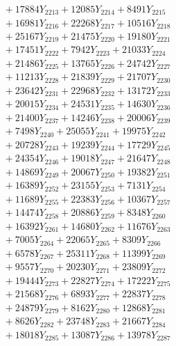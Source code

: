 \documentclass[a4paper,10pt]{article}
\begin{document}
{\begin{align}
&\;  + 17884 Y_{2213} + 12085 Y_{2214} + 8491 Y_{2215} \\[0.3ex]
&\;  + 16981 Y_{2216} + 22268 Y_{2217} + 10516 Y_{2218} \\[0.5ex]\allowbreak
&\;  + 25167 Y_{2219} + 21475 Y_{2220} + 19180 Y_{2221} \\[0.3ex]
&\;  + 17451 Y_{2222} + 7942 Y_{2223} + 21033 Y_{2224} \\[0.3ex]
&\;  + 21486 Y_{2225} + 13765 Y_{2226} + 24742 Y_{2227} \\[0.3ex]
&\;  + 11213 Y_{2228} + 21839 Y_{2229} + 21707 Y_{2230} \\[0.3ex]
&\;  + 23642 Y_{2231} + 22968 Y_{2232} + 13172 Y_{2233} \\[0.3ex]
&\;  + 20015 Y_{2234} + 24531 Y_{2235} + 14630 Y_{2236} \\[0.3ex]
&\;  + 21400 Y_{2237} + 14246 Y_{2238} + 20006 Y_{2239} \\[0.3ex]
&\;  + 7498 Y_{2240} + 25055 Y_{2241} + 19975 Y_{2242} \\[0.3ex]
&\;  + 20728 Y_{2243} + 19239 Y_{2244} + 17729 Y_{2245} \\[0.3ex]
&\;  + 24354 Y_{2246} + 19018 Y_{2247} + 21647 Y_{2248} \\[0.5ex]\allowbreak
&\;  + 14869 Y_{2249} + 20067 Y_{2250} + 19382 Y_{2251} \\[0.3ex]
&\;  + 16389 Y_{2252} + 23155 Y_{2253} + 7131 Y_{2254} \\[0.3ex]
&\;  + 11689 Y_{2255} + 22383 Y_{2256} + 10367 Y_{2257} \\[0.3ex]
&\;  + 14474 Y_{2258} + 20886 Y_{2259} + 8348 Y_{2260} \\[0.3ex]
&\;  + 16392 Y_{2261} + 14680 Y_{2262} + 11676 Y_{2263} \\[0.3ex]
&\;  + 7005 Y_{2264} + 22065 Y_{2265} + 8309 Y_{2266} \\[0.3ex]
&\;  + 6578 Y_{2267} + 25311 Y_{2268} + 11399 Y_{2269} \\[0.3ex]
&\;  + 9557 Y_{2270} + 20230 Y_{2271} + 23809 Y_{2272} \\[0.3ex]
&\;  + 19444 Y_{2273} + 22827 Y_{2274} + 17222 Y_{2275} \\[0.3ex]
&\;  + 21568 Y_{2276} + 6893 Y_{2277} + 22837 Y_{2278} \\[0.5ex]\allowbreak
&\;  + 24879 Y_{2279} + 8162 Y_{2280} + 12868 Y_{2281} \\[0.3ex]
&\;  + 8626 Y_{2282} + 23748 Y_{2283} + 21667 Y_{2284} \\[0.3ex]
&\;  + 18018 Y_{2285} + 13087 Y_{2286} + 13978 Y_{2287} \\[0.3ex]

\end{align}}
\end{document}
